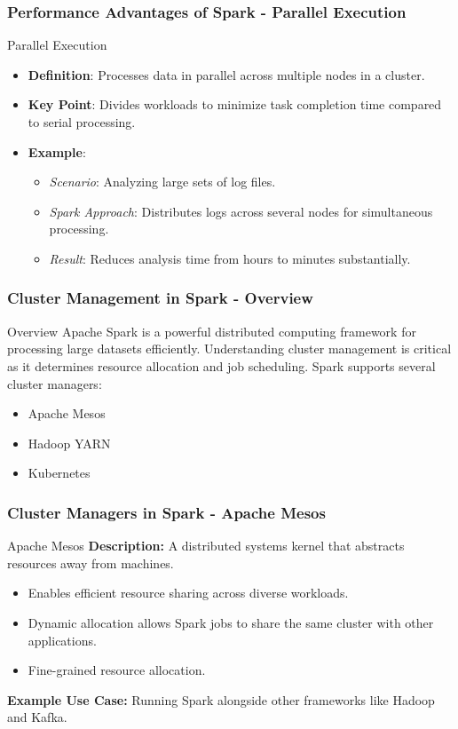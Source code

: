 \documentclass[aspectratio=169]{beamer}
\begin{document}
\begin{frame}[fragile]
    \frametitle{Performance Advantages of Spark - Parallel Execution}
    \begin{block}{Parallel Execution}
        \begin{itemize}
            \item \textbf{Definition}: Processes data in parallel across multiple nodes in a cluster.
            \item \textbf{Key Point}: Divides workloads to minimize task completion time compared to serial processing.
            \item \textbf{Example}:
            \begin{itemize}
                \item \textit{Scenario}: Analyzing large sets of log files.
                \item \textit{Spark Approach}: Distributes logs across several nodes for simultaneous processing.
                \item \textit{Result}: Reduces analysis time from hours to minutes substantially.
            \end{itemize}
        \end{itemize}
    \end{block}
\end{frame}

\begin{frame}[fragile]
    \frametitle{Cluster Management in Spark - Overview}
    \begin{block}{Overview}
        Apache Spark is a powerful distributed computing framework for processing large datasets efficiently.
        Understanding cluster management is critical as it determines resource allocation and job scheduling.
        Spark supports several cluster managers:
        \begin{itemize}
            \item Apache Mesos
            \item Hadoop YARN
            \item Kubernetes
        \end{itemize}
    \end{block}
\end{frame}

\begin{frame}[fragile]
    \frametitle{Cluster Managers in Spark - Apache Mesos}
    \begin{block}{Apache Mesos}
        \textbf{Description:} A distributed systems kernel that abstracts resources away from machines.
        \begin{itemize}
            \item Enables efficient resource sharing across diverse workloads.
            \item Dynamic allocation allows Spark jobs to share the same cluster with other applications.
            \item Fine-grained resource allocation.
        \end{itemize}
        \textbf{Example Use Case:} Running Spark alongside other frameworks like Hadoop and Kafka.
    \end{block}
\end{frame}
\end{document}
